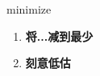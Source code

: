 
\begin{frame}
{\huge minimize}
\begin{center}
\begin{enumerate}\Large
  \item \textbf{将...减到最少}
  \item \textbf{刻意低估}
\end{enumerate}
\end{center}
\end{frame}
